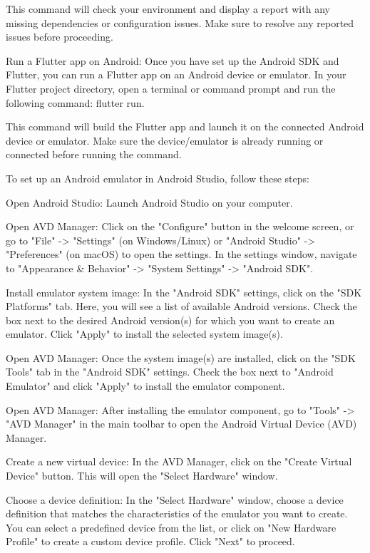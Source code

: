 This command will check your environment and display a report with any missing dependencies or configuration issues. 
Make sure to resolve any reported issues before proceeding.

Run a Flutter app on Android: Once you have set up the Android SDK and Flutter, you can run a Flutter app on an 
Android device or emulator. In your Flutter project directory, open a terminal or command prompt and run the 
following command: flutter run.

This command will build the Flutter app and launch it on the connected Android device or emulator. Make sure the 
device/emulator is already running or connected before running the command.

To set up an Android emulator in Android Studio, follow these steps:

Open Android Studio: Launch Android Studio on your computer.

Open AVD Manager: Click on the "Configure" button in the welcome screen, or go to "File" -> "Settings" (on Windows/Linux) 
or "Android Studio" -> "Preferences" (on macOS) to open the settings. In the settings window, navigate to 
"Appearance \& Behavior" -> "System Settings" -> "Android SDK".

Install emulator system image: In the "Android SDK" settings, click on the "SDK Platforms" tab. Here, you will 
see a list of available Android versions. Check the box next to the desired Android version(s) for which you want
 to create an emulator. Click "Apply" to install the selected system image(s).

Open AVD Manager: Once the system image(s) are installed, click on the "SDK Tools" tab in the "Android SDK" settings. 
Check the box next to "Android Emulator" and click "Apply" to install the emulator component.

Open AVD Manager: After installing the emulator component, go to "Tools" -> "AVD Manager" in the main toolbar to 
open the Android Virtual Device (AVD) Manager.

Create a new virtual device: In the AVD Manager, click on the "Create Virtual Device" button. This will open the 
"Select Hardware" window.

Choose a device definition: In the "Select Hardware" window, choose a device definition that matches the 
characteristics of the emulator you want to create. You can select a predefined device from the list, or click 
on "New Hardware Profile" to create a custom device profile. Click "Next" to proceed.

